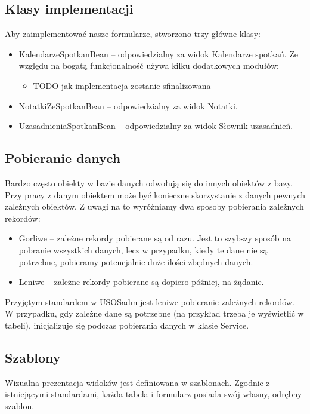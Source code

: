\documentclass[licencjacka]{pracamgr}
\begin{document}
\subsection{Klasy implementacji}
Aby zaimplementować nasze formularze, stworzono trzy główne klasy:

\begin{itemize}
\item KalendarzeSpotkanBean -- odpowiedzialny za widok Kalendarze spotkań. Ze względu na bogatą funkcjonalność używa kilku dodatkowych modułów:
\begin{itemize}
\item TODO jak implementacja zostanie sfinalizowana
\end{itemize}
\item NotatkiZeSpotkanBean -- odpowiedzialny za widok Notatki.
\item UzasadnieniaSpotkanBean -- odpowiedzialny za widok Słownik uzasadnień.
\end{itemize}

\subsection{Pobieranie danych}
Bardzo często obiekty w bazie danych odwołują się do innych obiektów z bazy. Przy pracy z danym obiektem może być konieczne skorzystanie z danych pewnych zależnych obiektów. Z uwagi na to wyróżniamy dwa sposoby pobierania zależnych rekordów:

\begin{itemize}
\item Gorliwe -- zależne rekordy pobierane są od razu. Jest to szybszy sposób na pobranie wszystkich danych, lecz w przypadku, kiedy te dane nie są potrzebne, pobieramy potencjalnie duże ilości zbędnych danych.
\item Leniwe -- zależne rekordy pobierane są dopiero później, na żądanie.
\end{itemize}

Przyjętym standardem w USOSadm jest leniwe pobieranie zależnych rekordów. W przypadku, gdy zależne dane są potrzebne (na przykład trzeba je wyświetlić w tabeli), inicjalizuje się podczas pobierania danych w klasie Service.

\subsection{Szablony}
Wizualna prezentacja widoków jest definiowana w szablonach. Zgodnie z istniejącymi standardami, każda tabela i formularz posiada swój własny, odrębny szablon.
\end{document}
